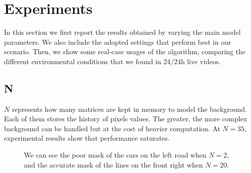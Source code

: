 \section*{Experiments}
In this section we first report the results obtained by varying the main model parameters. We also include the
adopted settings that perform best in our scenario. Then, we show some real-case usages of the algorithm,
comparing the different environmental conditions that we found in 24/24h live videos.

\subsection*{N}
$N$ represents how many matrices are kept in memory to model the background.
Each of them stores the history of pixels values.
The greater, the more complex background can be handled but at the cost of heavier
computation. At $N=35$, experimental results show that performance saturates.
\begin{figure}[!t]
\centering
{}
\newline
{}
\newline
{}
\caption{We can see the poor mask of the cars on the left road when $N=2$, and the
accurate mask of the lines on the front right when $N=20$.}
\end{figure}


